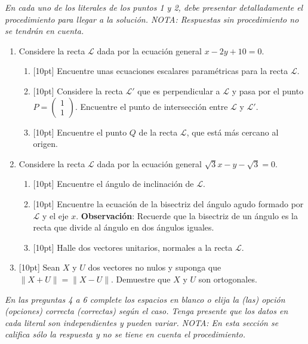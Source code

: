 \documentclass[11pt]{article}
\newcommand{\vect}[2]{\begin{pmatrix}#1\\#2\end{pmatrix}}
\newcommand{\nota}[1]{{\small\itshape\color{unalblue!70!black} #1}}
\begin{document}
\vspace{6pt}
\nota{En cada uno de los literales de los puntos 1 y 2, debe presentar detalladamente el procedimiento para llegar a la solución. NOTA: Respuestas sin procedimiento no se tendrán en cuenta.}

\begin{enumerate}
\item Considere la recta $\mathcal{L}$ dada por la ecuación general $x-2y+10=0$.

\begin{enumerate}[label=(\alph*)]
\item{}[10pt] Encuentre unas ecuaciones escalares paramétricas para la recta $\mathcal{L}$.
\item{}[10pt] Considere la recta $\mathcal{L}'$ que es perpendicular a $\mathcal{L}$ y pasa por el punto $P=\vect{1}{1}$. Encuentre el punto de intersección entre $\mathcal{L}$ y $\mathcal{L}'$.
\item{}[10pt] Encuentre el punto $Q$ de la recta $\mathcal{L}$, que está más cercano al origen.
\end{enumerate}

\item Considere la recta $\mathcal{L}$ dada por la ecuación general $\sqrt{3}x-y-\sqrt{3}=0$.

\begin{enumerate}[label=(\alph*)]
\item{}[10pt] Encuentre el ángulo de inclinación de $\mathcal{L}$.
\item{}[10pt] Encuentre la ecuación de la bisectriz del ángulo agudo formado por $\mathcal{L}$ y el eje $x$. \textbf{Observación}: Recuerde que la bisectriz de un ángulo es la recta que divide al ángulo en dos ángulos iguales.
\item{}[10pt] Halle dos vectores unitarios, normales a la recta $\mathcal{L}$.
\end{enumerate}

\item{}[10pt] Sean $X$ y $U$ dos vectores no nulos y suponga que $\|X+U\|=\|X-U\|$. Demuestre que $X$ y $U$ son ortogonales.
\end{enumerate}

\vspace{6pt}
\nota{En las preguntas 4 a 6 complete los espacios en blanco o elija la (las) opción (opciones) correcta (correctas) según el caso. Tenga presente que los datos en cada literal son independientes y pueden variar. NOTA: En esta sección se califica sólo la respuesta y no se tiene en cuenta el procedimiento.}
\end{document}
